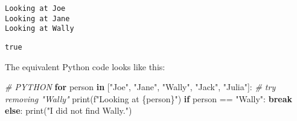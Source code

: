 \documentclass[11pt]{article}
\makeatletter
\newenvironment{Shaded}{}{}
\newcommand{\KeywordTok}[1]{\textcolor[rgb]{0.00,0.44,0.13}{\textbf{{#1}}}}
\newcommand{\StringTok}[1]{\textcolor[rgb]{0.25,0.44,0.63}{{#1}}}
\newcommand{\CommentTok}[1]{\textcolor[rgb]{0.38,0.63,0.69}{\textit{{#1}}}}
\newcommand{\NormalTok}[1]{{#1}}
\newcommand{\SpecialCharTok}[1]{\textcolor[rgb]{0.25,0.44,0.63}{{#1}}}
\newcommand{\SpecialStringTok}[1]{\textcolor[rgb]{0.73,0.40,0.53}{{#1}}}
\newcommand{\ControlFlowTok}[1]{\textcolor[rgb]{0.00,0.44,0.13}{\textbf{{#1}}}}
\newcommand{\OperatorTok}[1]{\textcolor[rgb]{0.40,0.40,0.40}{{#1}}}
\newcommand{\BuiltInTok}[1]{{#1}}
\newcommand{\boxspacing}{\kern\kvtcb@left@rule\kern\kvtcb@boxsep}
\newcommand{\prompt}[4]{
        {\ttfamily\llap{{\color{#2}[#3]:\hspace{3pt}#4}}\vspace{-\baselineskip}}
    }
\makeatother
\begin{document}
    \begin{Verbatim}[commandchars=\\\{\}]
Looking at Joe
Looking at Jane
Looking at Wally
    \end{Verbatim}

            \begin{tcolorbox}[breakable, size=fbox, boxrule=.5pt, pad at break*=1mm, opacityfill=0]
\prompt{Out}{outcolor}{80}{\boxspacing}
\begin{Verbatim}[commandchars=\\\{\}]
true
\end{Verbatim}
\end{tcolorbox}
        
    The equivalent Python code looks like this:

\begin{Shaded}
\begin{Highlighting}[]
\CommentTok{\# PYTHON}
\ControlFlowTok{for}\NormalTok{ person }\KeywordTok{in}\NormalTok{ [}\StringTok{"Joe"}\NormalTok{, }\StringTok{"Jane"}\NormalTok{, }\StringTok{"Wally"}\NormalTok{, }\StringTok{"Jack"}\NormalTok{, }\StringTok{"Julia"}\NormalTok{]: }\CommentTok{\# try removing "Wally"}
    \BuiltInTok{print}\NormalTok{(}\SpecialStringTok{f"Looking at }\SpecialCharTok{\{}\NormalTok{person}\SpecialCharTok{\}}\SpecialStringTok{"}\NormalTok{)}
    \ControlFlowTok{if}\NormalTok{ person }\OperatorTok{==} \StringTok{"Wally"}\NormalTok{:}
        \ControlFlowTok{break}
\ControlFlowTok{else}\NormalTok{:}
    \BuiltInTok{print}\NormalTok{(}\StringTok{"I did not find Wally."}\NormalTok{)}
\end{Highlighting}
\end{Shaded}
\end{document}
